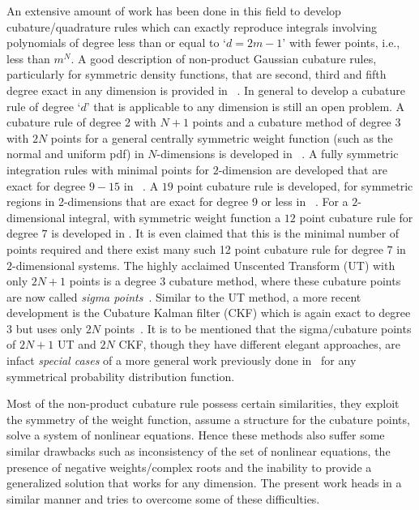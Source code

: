 \documentclass[letterpaper, 10 pt, conference]{IEEEtran}  %
\begin{document}
An extensive amount of work has been done in this field to develop cubature/quadrature rules which can exactly reproduce integrals involving polynomials of degree less than or equal to `$d=2m-1$'   with fewer points, i.e.,  less than $m^N$.  A good description of non-product Gaussian cubature rules, particularly for symmetric density functions, that are second, third and fifth degree exact in any dimension is provided in ~\cite{strACMI}. In general to develop a cubature rule of degree `$d$' that is applicable to any dimension is still an open problem. A cubature rule of degree 2 with $N+1$ points and a cubature method of degree 3 with $2N$ points for a general centrally symmetric weight function (such as the normal and uniform pdf) in $N$-dimensions is developed in ~\cite{str2d}. A fully symmetric integration rules with minimal points for $2$-dimension are developed that are exact for degree $9-15$ in ~\cite{phil2D}.  A $19$ point cubature rule is developed, for symmetric regions in 2-dimensions that are exact for degree 9 or less in ~\cite{Robd92D}. For a $2$-dimensional integral, with symmetric weight function a $12$ point cubature rule for degree $7$  is developed in \cite{Richd72D}. It is even claimed that this is the minimal number of points required and there exist many such 12 point cubature rule for degree
  $7$ in $2$-dimensional systems. %
The highly acclaimed Unscented Transform (UT) with only $2N+1$ points is a degree $3$ cubature method, where these cubature points are now called \emph{sigma points}~\cite{jul1}. Similar to the UT method, a more recent development is the Cubature Kalman filter (CKF) which is again exact to degree 3 but uses only $2N$ points~\cite{Arackf}. It is to be mentioned that the sigma/cubature points of $2N+1$ UT and $2N$ CKF, though they have different elegant approaches, are infact \emph{special cases} of a more general work previously done in~\cite{str2d} for any symmetrical probability distribution function.  

Most of the non-product cubature rule possess certain similarities, they exploit the symmetry of the weight function, assume a structure for the cubature points, solve a system of nonlinear equations. Hence these methods also suffer some similar drawbacks such as inconsistency of the set of nonlinear equations, the presence of negative weights/complex roots and the inability to provide a generalized solution that works for any dimension. The present work heads in a similar manner and tries to overcome some of these difficulties. 
\end{document}
